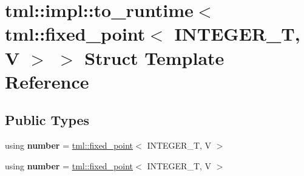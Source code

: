 \hypertarget{structtml_1_1impl_1_1to__runtime_3_01tml_1_1fixed__point_3_01INTEGER__T_00_01V_01_4_01_4}{\section{tml\+:\+:impl\+:\+:to\+\_\+runtime$<$ tml\+:\+:fixed\+\_\+point$<$ I\+N\+T\+E\+G\+E\+R\+\_\+\+T, V $>$ $>$ Struct Template Reference}
\label{structtml_1_1impl_1_1to__runtime_3_01tml_1_1fixed__point_3_01INTEGER__T_00_01V_01_4_01_4}
}
\subsection*{Public Types}
\begin{DoxyCompactItemize}
\item 
\hypertarget{structtml_1_1impl_1_1to__runtime_3_01tml_1_1fixed__point_3_01INTEGER__T_00_01V_01_4_01_4_ae0f7c21b5dd9fa8ce13d713928b4df5a}{using {\bfseries number} = \hyperlink{structtml_1_1fixed__point}{tml\+::fixed\+\_\+point}$<$ I\+N\+T\+E\+G\+E\+R\+\_\+\+T, V $>$}\label{structtml_1_1impl_1_1to__runtime_3_01tml_1_1fixed__point_3_01INTEGER__T_00_01V_01_4_01_4_ae0f7c21b5dd9fa8ce13d713928b4df5a}

\item 
\hypertarget{structtml_1_1impl_1_1to__runtime_3_01tml_1_1fixed__point_3_01INTEGER__T_00_01V_01_4_01_4_ae0f7c21b5dd9fa8ce13d713928b4df5a}{using {\bfseries number} = \hyperlink{structtml_1_1fixed__point}{tml\+::fixed\+\_\+point}$<$ I\+N\+T\+E\+G\+E\+R\+\_\+\+T, V $>$}\label{structtml_1_1impl_1_1to__runtime_3_01tml_1_1fixed__point_3_01INTEGER__T_00_01V_01_4_01_4_ae0f7c21b5dd9fa8ce13d713928b4df5a}

\end{DoxyCompactItemize}
